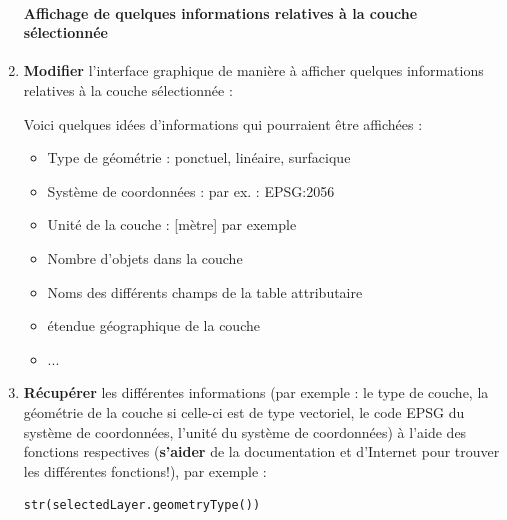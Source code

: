 \documentclass[11pt]{article}
\begin{document}
\begin{enumerate}
\paragraph*{Affichage de quelques informations relatives à la couche sélectionnée}

\item \textbf{Modifier} l'interface graphique de manière à afficher quelques informations relatives à la couche sélectionnée : 

Voici quelques idées d'informations qui pourraient être affichées : 

\begin{itemize}\itemsep0.2em
\renewcommand\labelitemi{\---}
\item Type de géométrie : ponctuel, linéaire, surfacique
\item Système de coordonnées : par ex. : EPSG:2056
\item Unité de la couche : [mètre] par exemple 
\item Nombre d'objets dans la couche 
\item Noms des différents champs de la table attributaire 
\item étendue géographique de la couche
\item ...
\end{itemize}

\item \textbf{Récupérer} les différentes informations (par exemple : le type de couche, la géométrie de la couche si celle-ci est de type vectoriel, le code EPSG du système de coordonnées, l'unité du système de coordonnées) à l'aide des fonctions respectives (\textbf{s'aider} de la documentation et d'Internet pour trouver les différentes fonctions!), par exemple : 
\vspace*{-0.8em}
\begin{center}
\begin{minipage}[t]{0.40\textwidth}
\begin{verbatim}
str(selectedLayer.geometryType())
\end{verbatim}
\end{minipage}
\end{center}
\vspace*{0.4em}




\end{enumerate}
\end{document}
